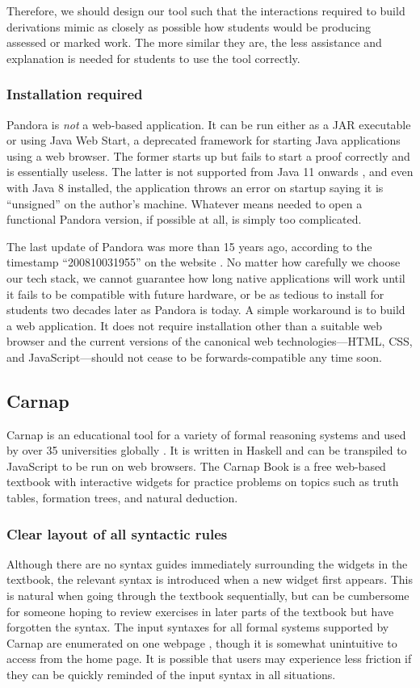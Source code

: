 Therefore, we should design our tool such that the interactions required to build derivations mimic as closely as possible how students would be producing assessed or marked work. The more similar they are, the less assistance and explanation is needed for students to use the tool correctly.

\subsubsection{Installation required}
Pandora is \textit{not} a web-based application. It can be run either as a JAR executable or using Java Web Start, a deprecated framework for starting Java applications using a web browser. The former starts up but fails to start a proof correctly and is essentially useless. The latter is not supported from Java 11 onwards \cite{oracle:2020}, and even with Java 8 installed, the application throws an error on startup saying it is ``unsigned'' on the author's machine. Whatever means needed to open a functional Pandora version, if possible at all, is simply too complicated.

The last update of Pandora was more than 15 years ago, according to the timestamp ``200810031955'' on the website \cite{pandora}. No matter how carefully we choose our tech stack, we cannot guarantee how long native applications will work until it fails to be compatible with future hardware, or be as tedious to install for students two decades later as Pandora is today. A simple workaround is to build a web application. It does not require installation other than a suitable web browser and the current versions of the canonical web technologies---HTML, CSS, and JavaScript---should not cease to be forwards-compatible any time soon.

\subsection{Carnap}
Carnap \cite{carnap, carnap:2018} is an educational tool for a variety of formal reasoning systems and used by over 35 universities globally \cite{carnap:about}. It is written in Haskell and can be transpiled to JavaScript to be run on web browsers. The Carnap Book \cite{carnap:book} is a free web-based textbook with interactive widgets for practice problems on topics such as truth tables, formation trees, and natural deduction.

\subsubsection{Clear layout of all syntactic rules}
 Although there are no syntax guides immediately surrounding the widgets in the textbook, the relevant syntax is introduced when a new widget first appears. This is natural when going through the textbook sequentially, but can be cumbersome for someone hoping to review exercises in later parts of the textbook but have forgotten the syntax. The input syntaxes for all formal systems supported by Carnap are enumerated on one webpage \cite{carnap:systems}, though it is somewhat unintuitive to access from the home page. It is possible that users may experience less friction if they can be quickly reminded of the input syntax in all situations.

